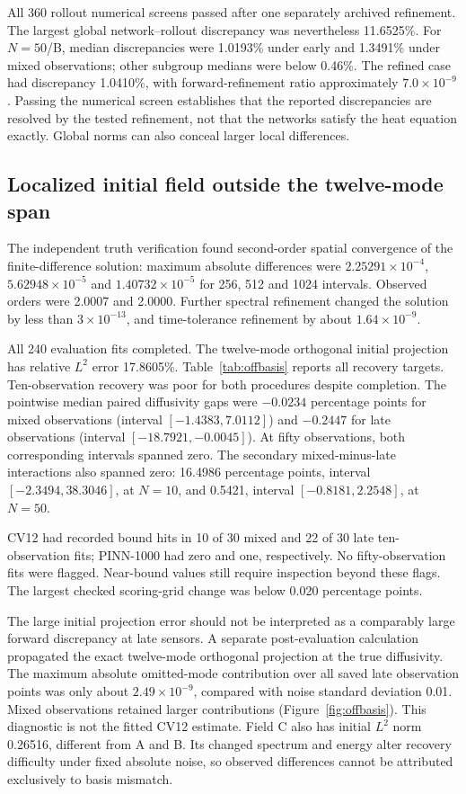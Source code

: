 \documentclass[11pt,a4paper]{article}
\begin{document}
All 360 rollout numerical screens passed after one separately archived refinement. The largest global network--rollout discrepancy was nevertheless 11.6525\%. For $N=50$/B, median discrepancies were 1.0193\% under early and 1.3491\% under mixed observations; other subgroup medians were below 0.46\%. The refined case had discrepancy 1.0410\%, with forward-refinement ratio approximately $7.0\times10^{-9}$. Passing the numerical screen establishes that the reported discrepancies are resolved by the tested refinement, not that the networks satisfy the heat equation exactly. Global norms can also conceal larger local differences.

\subsection{Localized initial field outside the twelve-mode span}
The independent truth verification found second-order spatial convergence of the finite-difference solution: maximum absolute differences were $2.25291\times10^{-4}$, $5.62948\times10^{-5}$ and $1.40732\times10^{-5}$ for 256, 512 and 1024 intervals. Observed orders were 2.0007 and 2.0000. Further spectral refinement changed the solution by less than $3\times10^{-13}$, and time-tolerance refinement by about $1.64\times10^{-9}$.

All 240 evaluation fits completed. The twelve-mode orthogonal initial projection has relative $L^2$ error 17.8605\%. Table~\ref{tab:offbasis} reports all recovery targets. Ten-observation recovery was poor for both procedures despite completion. The pointwise median paired diffusivity gaps were $-0.0234$ percentage points for mixed observations (interval $[-1.4383,7.0112]$) and $-0.2447$ for late observations (interval $[-18.7921,-0.0045]$). At fifty observations, both corresponding intervals spanned zero. The secondary mixed-minus-late interactions also spanned zero: 16.4986 percentage points, interval $[-2.3494,38.3046]$, at $N=10$, and 0.5421, interval $[-0.8181,2.2548]$, at $N=50$.



CV12 had recorded bound hits in 10 of 30 mixed and 22 of 30 late ten-observation fits; PINN-1000 had zero and one, respectively. No fifty-observation fits were flagged. Near-bound values still require inspection beyond these flags. The largest checked scoring-grid change was below 0.020 percentage points.

The large initial projection error should not be interpreted as a comparably large forward discrepancy at late sensors. A separate post-evaluation calculation propagated the exact twelve-mode orthogonal projection at the true diffusivity. The maximum absolute omitted-mode contribution over all saved late observation points was only about $2.49\times10^{-9}$, compared with noise standard deviation 0.01. Mixed observations retained larger contributions (Figure~\ref{fig:offbasis}). This diagnostic is not the fitted CV12 estimate. Field C also has initial $L^2$ norm 0.26516, different from A and B. Its changed spectrum and energy alter recovery difficulty under fixed absolute noise, so observed differences cannot be attributed exclusively to basis mismatch.
\end{document}
